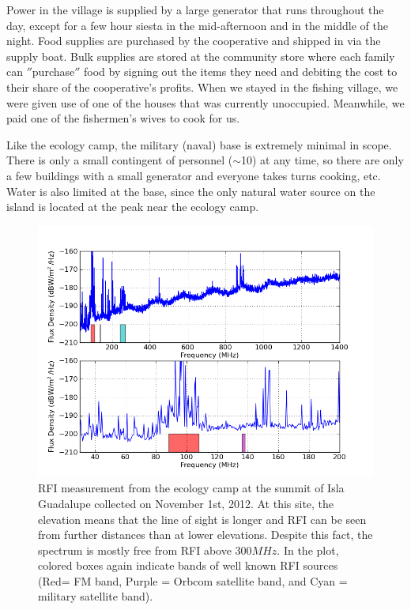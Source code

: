 Power in the village is supplied by a large generator that runs throughout the day, except for a few hour siesta in the mid-afternoon and in the middle of the night. Food supplies are purchased by the cooperative and shipped in via the supply boat. Bulk supplies are stored at the community store where each family can $''$purchase$''$ food by signing out the items they need and debiting the cost to their share of the cooperative's profits. When we stayed in the fishing village, we were given use of one of the houses that was currently unoccupied. Meanwhile, we paid one of the fishermen's wives to cook for us.  

Like the ecology camp, the military (naval) base is extremely minimal in scope. There is only a small contingent of personnel ($\sim$10) at any time, so there are only a few buildings with a small generator and everyone takes turns cooking, etc. Water is also limited at the base, since the only natural water source on the island is located at the peak near the ecology camp. 

\begin{figure}[tb]
\begin{center}
\includegraphics[width=0.9\linewidth]{RFI_testing/figures/GI_3__bands.png}
\caption{RFI measurement from the ecology camp at the summit of Isla Guadalupe collected on November 1st, 2012. At this site, the elevation means that the line of sight is longer and RFI can be seen from further distances than at lower elevations. Despite this fact, the spectrum is mostly free from RFI above $300 MHz$. In the plot, colored boxes again indicate bands of well known RFI sources (Red= FM band, Purple = Orbcom satellite band, and Cyan = military satellite band).}
\label{Fig:guadsummit}
\end{center}
\end{figure}


